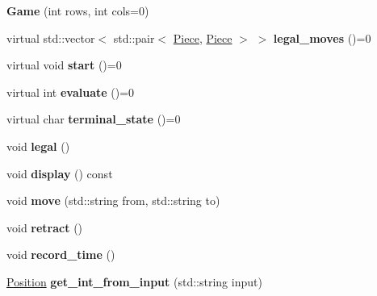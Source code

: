 \begin{DoxyCompactItemize}
\item 
\mbox{\label{class_game_ac8c9003009977a0ecf0c35e0002f0f9e}} 
{\bfseries Game} (int rows, int cols=0)
\item 
\mbox{\label{class_game_a205fc7dd195bc398138cc188aad8bc38}} 
virtual std\+::vector$<$ std\+::pair$<$ \hyperlink{class_piece}{Piece}, \hyperlink{class_piece}{Piece} $>$ $>$ {\bfseries legal\+\_\+moves} ()=0
\item 
\mbox{\label{class_game_add988158041df85337995e36f06756aa}} 
virtual void {\bfseries start} ()=0
\item 
\mbox{\label{class_game_a068b2b3012154457f362c90a80f46253}} 
virtual int {\bfseries evaluate} ()=0
\item 
\mbox{\label{class_game_ac7cbe36964272dd7dcd7e68fafaf24cc}} 
virtual char {\bfseries terminal\+\_\+state} ()=0
\item 
\mbox{\label{class_game_a69f0e2636aa7e85836418aea42792527}} 
void {\bfseries legal} ()
\item 
\mbox{\label{class_game_ae98bb6563800f3265d7da2445804ea97}} 
void {\bfseries display} () const
\item 
\mbox{\label{class_game_a00150c33b3469c2fb95653b2f3be36b6}} 
void {\bfseries move} (std\+::string from, std\+::string to)
\item 
\mbox{\label{class_game_a9be0655102af94f1a37a7eaec1be36fc}} 
void {\bfseries retract} ()
\item 
\mbox{\label{class_game_accc03cc11af1ef5614a265d2e9ed4841}} 
void {\bfseries record\+\_\+time} ()
\item 
\mbox{\label{class_game_a2a71f9781d47c4b7c62005bb14f6bfa3}} 
\hyperlink{struct_position}{Position} {\bfseries get\+\_\+int\+\_\+from\+\_\+input} (std\+::string input)
\item 
\mbox{\label{class_game_a255e5bb1512854fd8df8cef51fab49d8}} 

\end{DoxyCompactItemize}
